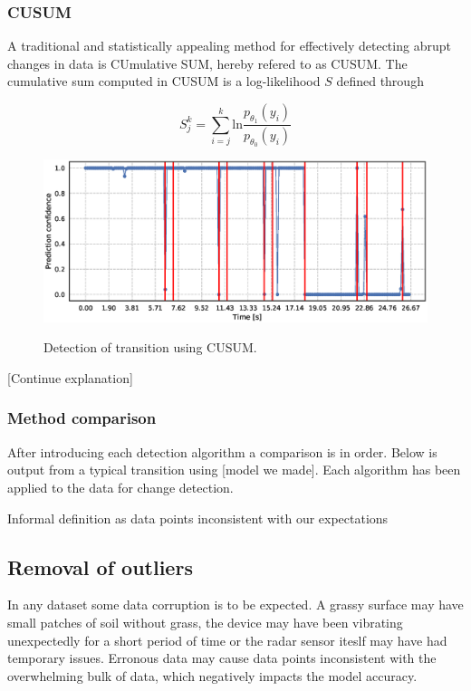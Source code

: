 \subsubsection{CUSUM}

A traditional and statistically appealing method for effectively detecting abrupt changes in data is CUmulative SUM, hereby refered to as CUSUM. The cumulative sum computed in CUSUM is a log-likelihood $S$ defined through

\begin{equation}
	S_j^k = \sum_{i=j}^k \text{ln}\frac{p_{\theta_1}(y_i)}{p_{\theta_0}(y_i)}
\end{equation}

\begin{figure}
	\includegraphics[scale=0.5]{figs_temp/detect_cusum}
	\label{fig:detect_cusum}
	\caption{Detection of transition using CUSUM.}
\end{figure}

[Continue explanation]


\citep{basseville_nikiforov_1993}




\subsubsection{Method comparison}

After introducing each detection algorithm a comparison is in order. Below is output from a typical transition using [model we made]. Each algorithm has been applied to the data for change detection.


Informal definition as data points inconsistent with our expectations

\subsection{Removal of outliers}

In any dataset some data corruption is to be expected. A grassy surface may have small patches of soil without grass, the device may have been vibrating unexpectedly for a short period of time or the radar sensor iteslf may have had temporary issues. Erronous data may cause data points inconsistent with the overwhelming bulk of data, which negatively impacts the model accuracy. 

